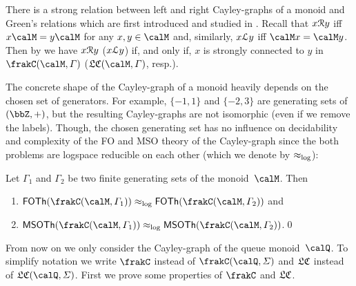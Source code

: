 \begin{remark}
	There is a strong relation between left and right Cayley-graphs of a monoid and Green's relations which are first introduced and studied in \cite{Gre51}. Recall that $x\mathcal{R} y$ iff $x\calM=y\calM$ for any $x,y\in\calM$ and, similarly, $x\mathcal{L} y$ iff $\calM x=\calM y$. Then by \cite[Proposition V.1.1]{pin2010} we have $x\mathcal{R} y$ ($x\mathcal{L} y$) if, and only if, $x$ is strongly connected to $y$ in $\cayley{\calM}{\varGamma}$ ($\lcayley{\calM}{\varGamma}$, resp.).
\end{remark}

The concrete shape of the Cayley-graph of a monoid heavily depends on the chosen set of generators. For example, $\{-1,1\}$ and $\{-2,3\}$ are generating sets of $(\bbZ,+)$, but the resulting Cayley-graphs are not isomorphic (even if we remove the labels). Though, the chosen generating set has no influence on decidability and complexity of the FO and MSO theory of the Cayley-graph since the both problems are logspace reducible on each other (which we denote by $\approx_{\operatorname{log}}$):

\begin{proposition}
	Let $\varGamma_1$ and $\varGamma_2$ be two finite generating sets of the monoid~$\calM$. Then
	\begin{enumerate}[(1)]
		\item $\FOTh{\cayley{\calM}{\varGamma_1}}\eqlog\FOTh{\cayley{\calM}{\varGamma_2}}$ and
		\item $\MSOTh{\cayley{\calM}{\varGamma_1}}\eqlog\MSOTh{\cayley{\calM}{\varGamma_2}}$.\qed
	\end{enumerate}
\end{proposition}

From now on we only consider the Cayley-graph of the queue monoid~$\Qx$. To simplify notation we write $\cQ$ instead of $\cayley{\Qx}{\varSigma}$ and $\mathfrak{LC}$ instead of $\lcayley{\Qx}{\varSigma}$. First we prove some properties of $\cQ$ and $\mathfrak{LC}$.

